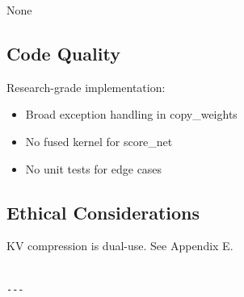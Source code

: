 None

\subsection{Code Quality}

Research-grade implementation:
\begin{itemize}
\item Broad exception handling in copy\_weights
\item No fused kernel for score\_net
\item No unit tests for edge cases

\end{itemize}
\subsection{Ethical Considerations}

KV compression is dual-use. See Appendix E.
\begin{lstlisting}

---
\end{lstlisting}